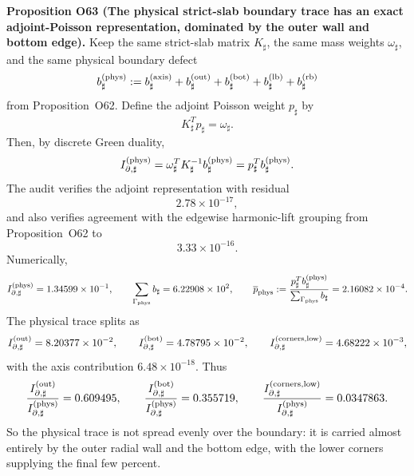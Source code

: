 \documentclass[aps,prd,onecolumn,notitlepage,nofootinbib,superscriptaddress,11pt,floatfix]{revtex4-2}
\begin{document}
\medskip\noindent\textbf{Proposition O63 (The physical strict-slab boundary trace has an exact adjoint-Poisson representation, dominated by the outer wall and bottom edge).}
Keep the same strict-slab matrix \(K_\sharp\), the same mass weights \(\omega_\sharp\), and the same physical boundary defect
\[
b_\sharp^{(\rm phys)}
:=
b_\sharp^{(\rm axis)}
+
b_\sharp^{(\rm out)}
+
b_\sharp^{(\rm bot)}
+
b_\sharp^{(\rm lb)}
+
b_\sharp^{(\rm rb)}
\]
from Proposition~O62.  Define the adjoint Poisson weight \(p_\sharp\) by
\[
K_\sharp^T p_\sharp=\omega_\sharp.
\]
Then, by discrete Green duality,
\[
I_{\partial,\sharp}^{(\rm phys)}
=
\omega_\sharp^T K_\sharp^{-1} b_\sharp^{(\rm phys)}
=
p_\sharp^T b_\sharp^{(\rm phys)}.
\]
The audit
verifies the adjoint representation with residual
\[
2.78\times10^{-17},
\]
and also verifies agreement with the edgewise harmonic-lift grouping from Proposition~O62 to
\[
3.33\times10^{-16}.
\]
Numerically,
\[
I_{\partial,\sharp}^{(\rm phys)}=1.34599\times10^{-1},
\qquad
\sum_{\Gamma_{\rm phys}} b_\sharp=6.22908\times10^{2},
\qquad
\overline p_{\rm phys}:=
\frac{p_\sharp^T b_\sharp^{(\rm phys)}}{\sum_{\Gamma_{\rm phys}} b_\sharp}
=2.16082\times10^{-4}.
\]
The physical trace splits as
\[
I_{\partial,\sharp}^{(\rm out)}=8.20377\times10^{-2},
\qquad
I_{\partial,\sharp}^{(\rm bot)}=4.78795\times10^{-2},
\qquad
I_{\partial,\sharp}^{(\rm corners,low)}=4.68222\times10^{-3},
\]
with the axis contribution \(6.48\times10^{-18}\).  Thus
\[
\frac{I_{\partial,\sharp}^{(\rm out)}}{I_{\partial,\sharp}^{(\rm phys)}}=0.609495,
\qquad
\frac{I_{\partial,\sharp}^{(\rm bot)}}{I_{\partial,\sharp}^{(\rm phys)}}=0.355719,
\qquad
\frac{I_{\partial,\sharp}^{(\rm corners,low)}}{I_{\partial,\sharp}^{(\rm phys)}}=0.0347863.
\]
So the physical trace is not spread evenly over the boundary: it is carried almost entirely by the outer radial wall and the bottom edge, with the lower corners supplying the final few percent.
\end{document}
